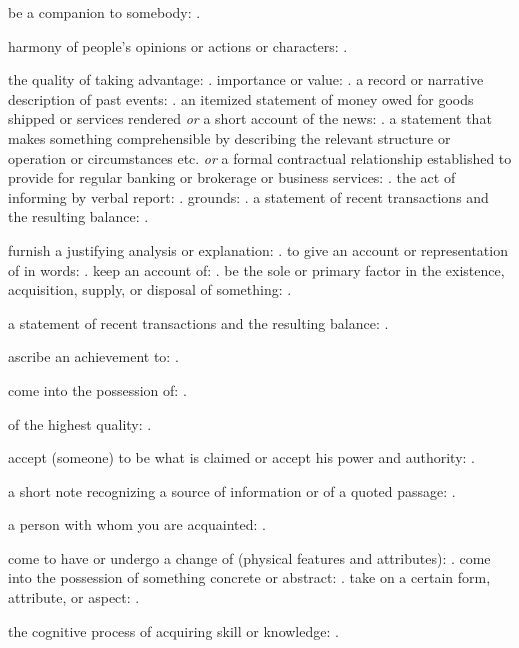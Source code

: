   be a companion to somebody: .

  harmony of people's opinions or actions or characters: .

  the quality of taking advantage: . importance or value: . a record or narrative description of past events: . an itemized statement of money owed for goods shipped or services rendered \textit{or} a short account of the news: . a statement that makes something comprehensible by describing the relevant structure or operation or circumstances etc. \textit{or} a formal contractual relationship established to provide for regular banking or brokerage or business services: . the act of informing by verbal report: . grounds: . a statement of recent transactions and the resulting balance: .

  furnish a justifying analysis or explanation: . to give an account or representation of in words: . keep an account of: . be the sole or primary factor in the existence, acquisition, supply, or disposal of something: .

  a statement of recent transactions and the resulting balance: .

  ascribe an achievement to: .

  come into the possession of: .

  of the highest quality: .

  accept (someone) to be what is claimed or accept his power and authority: .

  a short note recognizing a source of information or of a quoted passage: .

  a person with whom you are acquainted: .

  come to have or undergo a change of (physical features and attributes): . come into the possession of something concrete or abstract: . take on a certain form, attribute, or aspect: .

  the cognitive process of acquiring skill or knowledge: .

